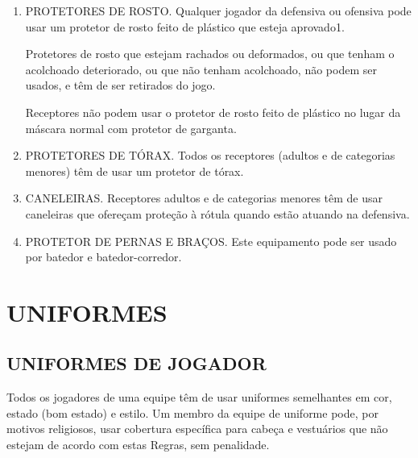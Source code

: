 \begin{enumerate}
	\item  PROTETORES DE ROSTO. Qualquer jogador da defensiva ou ofensiva pode usar um protetor de rosto feito de plástico que esteja aprovado1.

	Protetores de rosto que estejam rachados ou deformados, ou que tenham o acolchoado deteriorado, ou que não tenham acolchoado, não podem ser usados, e têm de ser retirados do jogo.

	Receptores não podem usar o protetor de rosto feito de plástico no lugar da máscara normal com protetor de garganta.

	\item  PROTETORES DE TÓRAX. Todos os receptores (adultos e de categorias menores) têm de usar um protetor de tórax.
	\item  CANELEIRAS. Receptores adultos e de categorias menores têm de usar caneleiras que ofereçam proteção à rótula quando estão atuando na defensiva.
	\item  PROTETOR DE PERNAS E BRAÇOS. Este equipamento pode ser usado por batedor e batedor-corredor.
\end{enumerate}

\section{UNIFORMES}
\subsection{UNIFORMES DE JOGADOR}
Todos os jogadores de uma equipe têm de usar uniformes semelhantes em cor, estado (bom estado) e estilo. Um membro da equipe de uniforme pode, por motivos religiosos, usar cobertura específica para cabeça e vestuários que não estejam de acordo com estas Regras, sem penalidade.

